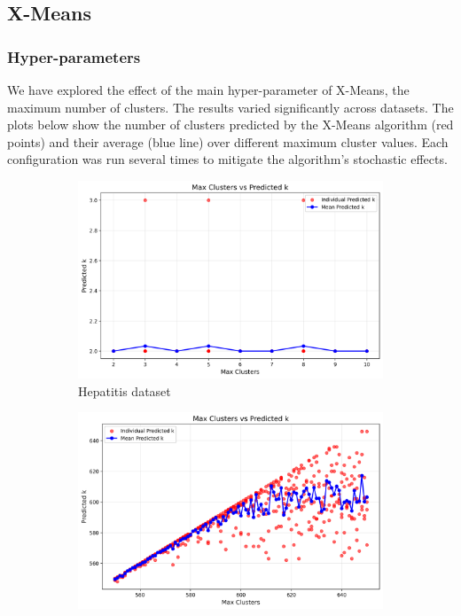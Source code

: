 \subsection{X-Means}
\subsubsection{Hyper-parameters}
We have explored the effect of the main hyper-parameter of X-Means, the maximum number of clusters. The results varied significantly across datasets. The plots below show the number of clusters predicted by the X-Means algorithm (red points) and their average (blue line) over different maximum cluster values. Each configuration was run several times to mitigate the algorithm's stochastic effects.

\begin{figure}[H]
	\centering
	\begin{subfigure}[b]{0.32\textwidth}
		\centering
		\includegraphics[width=\linewidth]{figures/XMeans/hepatitis_max_k_vs_predicted_k.png}
		\caption{Hepatitis dataset}
		\label{fig:hepatitis_max_k}
	\end{subfigure}
	\begin{subfigure}[b]{0.32\textwidth}
		\centering
		\includegraphics[width=\linewidth]{figures/XMeans/mushroom_max_k_vs_predicted_k.png}

\end{subfigure}
\end{figure}
